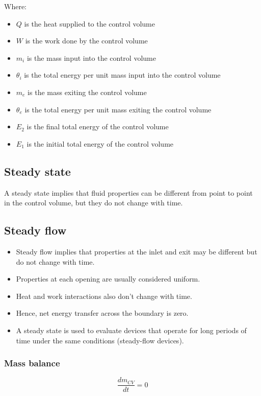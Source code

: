 \documentclass[11pt]{article}
\begin{document}
Where:
\begin{itemize}
\item \(Q\) is the heat supplied to the control volume
\item \(W\) is the work done by the control volume
\item \(m_i\) is the mass input into the control volume
\item \(\theta_i\) is the total energy per unit mass input into the control volume
\item \(m_e\) is the mass exiting the control volume
\item \(\theta_e\) is the total energy per unit mass exiting the control volume
\item \(E_2\) is the final total energy of the control volume
\item \(E_1\) is the initial total energy of the control volume
\end{itemize}

\subsection{Steady state}
\label{sec:org856e84d}
A steady state implies that fluid properties can be different from point to point in the control volume, but they do not change with time.

\subsection{Steady flow}
\label{sec:org1d23fa5}
\begin{itemize}
\item Steady flow implies that properties at the inlet and exit may be different but do not change with time.
\item Properties at each opening are usually considered uniform.
\item Heat and work interactions also don't change with time.
\item Hence, net energy transfer across the boundary is zero.
\item A steady state is used to evaluate devices that operate for long periods of time under the same conditions (steady-flow devices).
\end{itemize}

\subsubsection{Mass balance}
\label{sec:org4e5919b}
\[\frac{dm_{CV}}{dt} = 0\]
\end{document}
